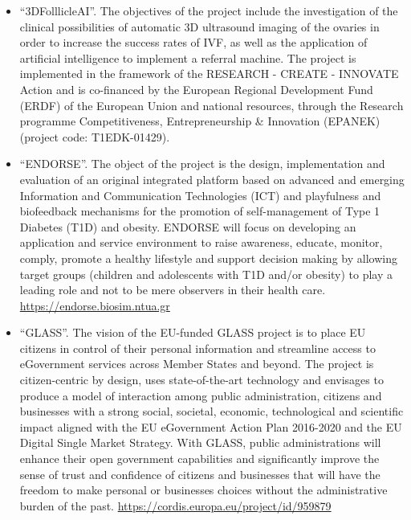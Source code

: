 \documentclass[a4paper,oneside,10pt]{article}
\begin{document}
\begin{itemize}
\begin{sloppypar}
\end{sloppypar}

\item \begin{sloppypar}
``3DFolllicleAI''. The objectives of the project include the investigation of the clinical possibilities of automatic 3D ultrasound imaging of the ovaries in order to increase the success rates of IVF, as well as the application of artificial intelligence to implement a referral machine. The project is implemented in the framework of the RESEARCH - CREATE - INNOVATE Action and is co-financed by the European Regional Development Fund (ERDF) of the European Union and national resources, through the Research programme Competitiveness, Entrepreneurship \& Innovation (EPANEK) (project code: T1EDK-01429).

\end{sloppypar}

\item \begin{sloppypar}
``ENDORSE''. The object of the project is the design, implementation and evaluation of an original integrated platform based on advanced and emerging Information and Communication Technologies (ICT) and playfulness and biofeedback mechanisms for the promotion of self-management of Type 1 Diabetes (T1D) and obesity. ENDORSE will focus on developing an application and service environment to raise awareness, educate, monitor, comply, promote a healthy lifestyle and support decision making by allowing target groups (children and adolescents with T1D and/or obesity) to play a leading role and not to be mere observers in their health care. \url{https://endorse.biosim.ntua.gr}

\end{sloppypar}


\item \begin{sloppypar}
``GLASS''. The vision of the EU-funded GLASS project is to place EU citizens in control of their personal information and streamline access to eGovernment services across Member States and beyond. The project is citizen-centric by design, uses state-of-the-art technology and envisages to produce a model of interaction among public administration, citizens and businesses with a strong social, societal, economic, technological and scientific impact aligned with the EU eGovernment Action Plan 2016-2020 and the EU Digital Single Market Strategy. With GLASS, public administrations will enhance their open government capabilities and significantly improve the sense of trust and confidence of citizens and businesses that will have the freedom to make personal or businesses choices without the administrative burden of the past. \url{https://cordis.europa.eu/project/id/959879}


\end{sloppypar}
\end{itemize}
\end{document}
